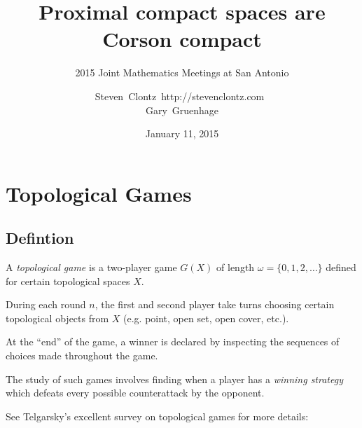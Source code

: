 \documentclass{beamer}
\title
{Proximal compact spaces are Corson compact}
\subtitle
{2015 Joint Mathematics Meetings at San Antonio} %
\author%
{Steven~Clontz~http://stevenclontz.com~\\Gary~Gruenhage}%
\institute[Auburn University] %
{
  Department of Mathematics and Statistics\\
  Auburn University}
\date[15-01-11] %
{January 11, 2015}
\theoremstyle{definition}
\newcommand{\<}{\langle}
\renewcommand{\>}{\rangle}
\newcommand{\term}{\textit}
\begin{document}
\newcommand{\vspacing}{\vspace{1em}}
\newcommand{\vpause}{\pause\vspacing}

\begin{frame}
  \titlepage
\end{frame}

\section{Topological Games}

\subsection{Defintion}

\begin{frame}
  A \term{topological game} is a two-player game $G(X)$ of length
  $\omega=\{0,1,2,\dots\}$ defined for certain topological spaces $X$.

  \vpause

  During each round $n$, the first and second player take turns choosing
  certain topological objects from $X$ (e.g. point, open set, open cover, etc.).

  \vpause

  At the ``end'' of the game, a winner is declared by inspecting the sequences
  of choices made throughout the game.

  \vpause

  The study of such games involves finding when a player has a
  \term{winning strategy} which defeats every possible counterattack by
  the opponent.

  \vpause

  {\tiny See Telgarsky's excellent survey on topological games for more
  details: \cite{MR892457}}
\end{frame}




\end{document}
